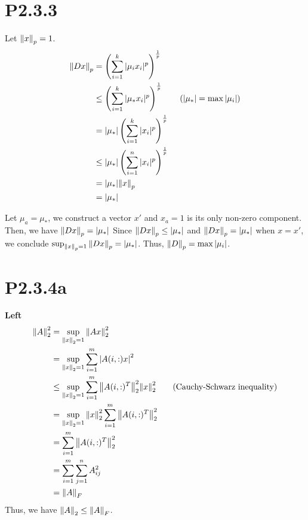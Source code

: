 \documentclass{article}
\begin{document}
\section*{P2.3.3}
Let $\norm{x}_p=1$.
\begin{align*}
    \norm{Dx}_p
     & =  \left(\sum_{i=1}^k|\mu_ix_i|^p\right)^\frac{1}{p}                                   \\
     & \le  \left(\sum_{i=1}^k|\mu_*x_i|^p\right)^\frac{1}{p}  \tag*{($|\mu_*|=\max|\mu_i|$)} \\
     & = |\mu_*|  \left(\sum_{i=1}^k|x_i|^p\right)^\frac{1}{p}                                \\
     & \le |\mu_*|  \left(\sum_{i=1}^n|x_i|^p\right)^\frac{1}{p}                              \\
     & = |\mu_*|  \norm{x}_p                                                                  \\
     & = |\mu_*|
\end{align*}

Let $\mu_a = \mu_*$, we construct a vector $x'$ and $x_a=1$ is its only non-zero component.
Then, we have $\norm{Dx}_p=|\mu_*|$
Since $\norm{Dx}_p \le |\mu_*|$ and $\norm{Dx}_p = |\mu_*|$ when $x=x'$,
we conclude ${\sup_{\norm{x}_p=1} \norm{Dx}_p = |\mu_*|}$. Thus, $\norm{D}_p=\max|\mu_i|$.

\section*{P2.3.4a}
\textbf{Left}
\begin{align*}
    \norm{A}_2^2
     & = \sup_{\norm{x}_2=1}
    \norm{Ax}_2^2                                                                    \\
     & =  \sup_{\norm{x}_2=1}
    \sum_{i=1}^m\left|A(i,:)x\right|^2                                               \\
     & \le  \sup_{\norm{x}_2=1}
    \sum_{i=1}^m \norm{A(i,:)^T}_2^2 \norm{x}_2^2 \tag*{(Cauchy-Schwarz inequality)} \\
     & = \sup_{\norm{x}_2=1}
    \norm{x}_2^2 \sum_{i=1}^m \norm{A(i,:)^T}_2^2                                    \\
     & = \sum_{i=1}^m \norm{A(i,:)^T}_2^2                                            \\
     & =\sum_{i=1}^m \sum_{j=1}^n A_{ij}^2                                           \\
     & = \norm{A}_F
\end{align*}
Thus, we have $\norm{A}_2 \le \norm{A}_F$.
\end{document}
